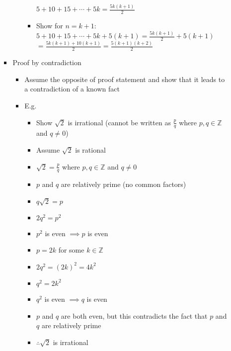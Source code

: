 \documentclass[12pt]{article}
\begin{document}
\begin{enumerate}
\begin{itemize}
\begin{itemize}
\begin{itemize}
\begin{itemize}
                        $5+10+15+\cdots+5k = \frac{5k(k+1)}{2}$
                        \item Show for $n = k+1$: \\
                        $5 + 10 + 15 + \cdots + 5k + 5(k+1) = \frac{5k(k+1)}{2} + 5(k+1)$ \\
                        $= \frac{5k(k+1) + 10(k+1)}{2} = \frac{5(k+1)(k+2)}{2}$
                    \end{itemize}
                \end{itemize}
                \item Proof by contradiction
                \begin{itemize}
                    \item Assume the opposite of proof statement and show that it leads to a contradiction of a known fact
                    \item E.g.
                    \begin{itemize}
                        \item Show $\sqrt{2}$ is irrational (cannot be written as $\frac{p}{q}$ where $p, q \in \mathbb{Z}$ and $q \neq 0$)
                        \item Assume $\sqrt{2}$ is rational
                        \item $\sqrt{2} = \frac{p}{q}$ where $p, q \in \mathbb{Z}$ and $q \neq 0$
                        \item $p$ and $q$ are relatively prime (no common factors)
                        \item $q\sqrt{2} = p$
                        \item $2q^2 = p^2$
                        \item $p^2$ is even $\implies p$ is even
                        \item $p = 2k$ for some $k \in \mathbb{Z}$
                        \item $2q^2 = {(2k)}^2 = 4k^2$
                        \item $q^2 = 2k^2$
                        \item $q^2$ is even $\implies q$ is even
                        \item $p$ and $q$ are both even, but this contradicts the fact that $p$ and $q$ are relatively prime
                        \item $\therefore \sqrt{2}$ is irrational
                    \end{itemize}
                \end{itemize}

\end{itemize}
\end{itemize}
\end{enumerate}
\end{document}
